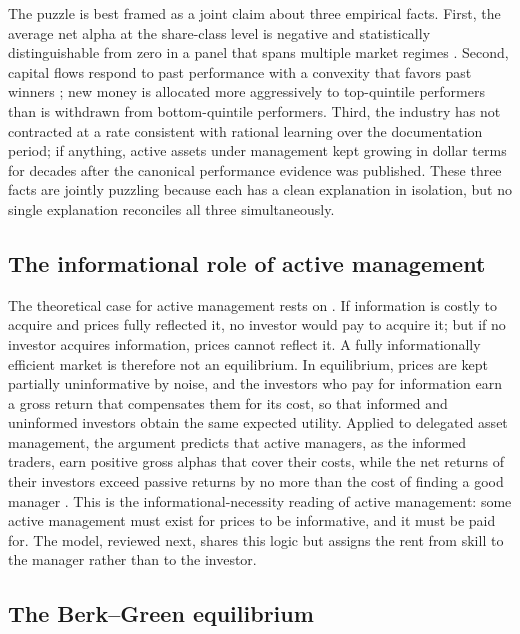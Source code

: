 \documentclass[12pt, oneside]{report}
\begin{document}
\noindent The puzzle is best framed as a joint claim about three empirical
facts. First, the average net alpha at the share-class level is negative
and statistically distinguishable from zero in a panel that spans
multiple market regimes \parencite{Carhart1997,FamaFrench2010,BarrasScailletWermers2010}.
Second, capital flows respond to past performance with a convexity that
favors past winners \parencite{SirriTufano1998,ChevalierEllison1997}; new
money is allocated more aggressively to top-quintile performers than is
withdrawn from bottom-quintile performers. Third, the industry has not
contracted at a rate consistent with rational learning over the
documentation period; if anything, active assets under management kept
growing in dollar terms for decades after the canonical performance
evidence was published. These three facts are jointly puzzling because each has a clean
explanation in isolation, but no single explanation reconciles all three
simultaneously.

\subsection{The informational role of active management}
\label{sec:grossman_stiglitz}

\noindent The theoretical case for active management rests on
\textcite{GrossmanStiglitz1980}. If information is costly to acquire and
prices fully reflected it, no investor would pay to acquire it; but if no
investor acquires information, prices cannot reflect it. A fully
informationally efficient market is therefore not an equilibrium. In
equilibrium, prices are kept partially uninformative by noise, and the
investors who pay for information earn a gross return that compensates them
for its cost, so that informed and uninformed investors obtain the same
expected utility. Applied to delegated asset management, the argument
predicts that active managers, as the informed traders, earn positive gross
alphas that cover their costs, while the net returns of their investors
exceed passive returns by no more than the cost of finding a good manager
\parencite{GarleanuPedersen2018}. This is the informational-necessity reading
of active management: some active management must exist for prices to be
informative, and it must be paid for. The \textcite{BerkGreen2004} model,
reviewed next, shares this logic but assigns the rent from skill to the
manager rather than to the investor.

\subsection{The Berk--Green equilibrium}
\label{sec:bg_equilibrium}
\end{document}

